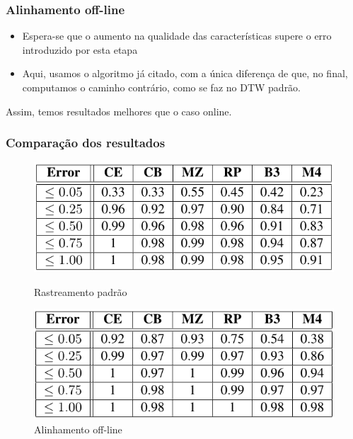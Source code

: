 
\begin{frame}
  \frametitle{Alinhamento off-line}
  \begin{itemize}
    \item Espera-se que o aumento na qualidade das características supere o erro introduzido por esta etapa\pause
    \item Aqui, usamos o algoritmo já citado, com a única diferença de que, no final, computamos o caminho contrário, como se faz no DTW padrão.
  \end{itemize}
  Assim, temos resultados melhores que o caso online.
\end{frame}

\begin{frame}
  \frametitle{Comparação dos resultados}

  \begin{figure}[!tbp]
    \centering
    \begin{minipage}[b]{0.45\textwidth}
      \includegraphics[width=\textwidth]{src/img/1-Table2-1.png}
      \caption*{Rastreamento padrão}
    \end{minipage}
    \hfill
    \begin{minipage}[b]{0.45\textwidth}
      \includegraphics[width=\textwidth]{src/img/1-Table3-1.png}
      \caption*{Alinhamento off-line}
    \end{minipage}
  \end{figure}
\end{frame}

